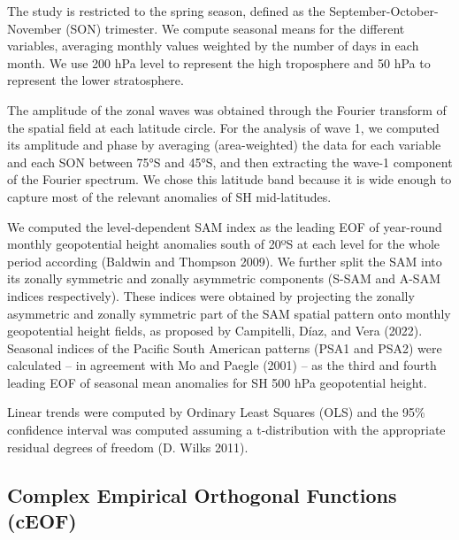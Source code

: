 \documentclass[smallextended]{svjour3}       %
\begin{document}
The study is restricted to the spring season, defined as the September-October-November (SON) trimester.
We compute seasonal means for the different variables, averaging monthly values weighted by the number of days in each month.
We use 200 hPa level to represent the high troposphere and 50 hPa to represent the lower stratosphere.

The amplitude of the zonal waves was obtained through the Fourier transform of the spatial field at each latitude circle.
For the analysis of wave 1, we computed its amplitude and phase by averaging (area-weighted) the data for each variable and each SON between 75°S and 45°S, and then extracting the wave-1 component of the Fourier spectrum.
We chose this latitude band because it is wide enough to capture most of the relevant anomalies of SH mid-latitudes.

We computed the level-dependent SAM index as the leading EOF of year-round monthly geopotential height anomalies south of 20ºS at each level for the whole period according (Baldwin and Thompson 2009).
We further split the SAM into its zonally symmetric and zonally asymmetric components (S-SAM and A-SAM indices respectively).
These indices were obtained by projecting the zonally asymmetric and zonally symmetric part of the SAM spatial pattern onto monthly geopotential height fields, as proposed by Campitelli, Díaz, and Vera (2022).
Seasonal indices of the Pacific South American patterns (PSA1 and PSA2) were calculated -- in agreement with Mo and Paegle (2001) -- as the third and fourth leading EOF of seasonal mean anomalies for SH 500 hPa geopotential height.

Linear trends were computed by Ordinary Least Squares (OLS) and the 95\% confidence interval was computed assuming a t-distribution with the appropriate residual degrees of freedom (D. Wilks 2011).

\hypertarget{complex-empirical-orthogonal-functions-ceof}{%
\subsection{Complex Empirical Orthogonal Functions (cEOF)}\label{complex-empirical-orthogonal-functions-ceof}}
\end{document}
